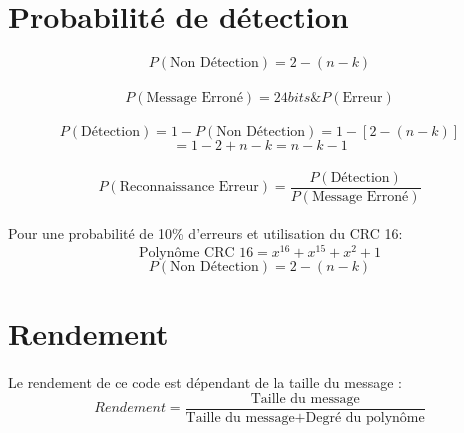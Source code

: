     \section{Probabilité de détection}

        \paragraph{}
\[  P(\text{Non Détection}) = 2-(n-k) \]
        \paragraph{}
\[  P(\text{Message Erroné}) = 24bits \& P(\text{Erreur}) \]
        \paragraph{}
\[  P(\text{Détection}) = 1 - P(\text{Non Détection}) = 1 - [2-(n-k)] \]
\[ = 1 - 2 + n - k = n - k - 1\]
        \paragraph{}
\[  P(\text{Reconnaissance Erreur}) = \frac{P(\text{Détection})}{P(\text{Message Erroné})}\]
        \paragraph{}
Pour une probabilité de 10\% d'erreurs et utilisation du CRC 16:
\[  \text{Polynôme CRC 16} = x^{16} + x^{15} + x^{2}+ 1 \]
\[  P(\text{Non Détection}) = 2-(n-k) \]


    \section{Rendement}

        \paragraph{}
Le rendement de ce code est dépendant de la taille du message :
\[  Rendement = \frac{\text{Taille du message}}{\text{Taille du message} + \text{Degré du polynôme}} \]
